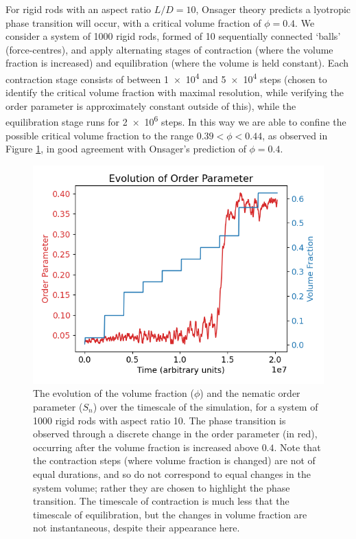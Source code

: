 \documentclass[11pt, a4paper]{article} %
\begin{document}
For rigid rods with an aspect ratio $L/D = 10$, Onsager theory predicts a lyotropic phase transition will occur, with a critical volume fraction of $\phi  = 0.4$. We consider a system of 1000 rigid rods, formed of 10 sequentially connected `balls' (force-centres), and apply alternating stages of contraction (where the volume fraction is increased) and equilibration (where the volume is held constant). Each contraction stage consists of between \num{1e4} and \num{5e4} steps (chosen to identify the critical volume fraction with maximal resolution, while verifying the order parameter is approximately constant outside of this), while the equilibration stage runs for \num{2e6} steps. In this way we are able to confine the possible critical volume fraction to the range $0.39 < \phi< 0.44$, as observed in Figure \ref{fig:rr_nemorderparam}, in good agreement with Onsager's prediction of $\phi = 0.4$.

\begin{figure} [h!]
	\centering
	\includegraphics[width=0.7\linewidth]{Figures/rigidrod_nemorderparam}
	\caption{The evolution of the volume fraction ($\phi$) and the nematic order parameter ($S_{n}$) over the timescale of the simulation, for a system of 1000 rigid rods with aspect ratio 10. The phase transition is observed through a discrete change in the order parameter (in red), occurring after the volume fraction is increased above $0.4$. Note that the contraction steps (where volume fraction is changed) are not of equal durations, and so do not correspond to equal changes in the system volume; rather they are chosen to highlight the phase transition. The timescale of contraction is much less that the timescale of equilibration, but the changes in volume fraction are not instantaneous, despite their appearance here.}
	\label{fig:rr_nemorderparam}
\end{figure}  %
\end{document}

